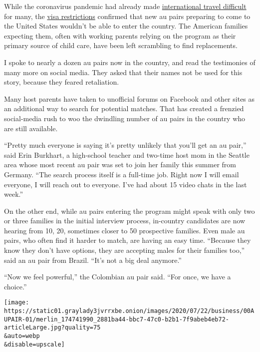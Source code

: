 While the coronavirus pandemic had already made
\href{https://www.nytimes3xbfgragh.onion/2020/05/13/us/politics/trump-coronavirus-border-restrictions.html?action=click\&module=RelatedLinks\&pgtype=Article}{international
travel difficult} for many, the
\href{https://www.nytimes3xbfgragh.onion/2020/06/12/us/politics/coronavirus-trump-immigration-policies.html?action=click\&module=RelatedLinks\&pgtype=Article}{visa
restrictions} confirmed that new au pairs preparing to come to the
United States wouldn't be able to enter the country. The American
families expecting them, often with working parents relying on the
program as their primary source of child care, have been left scrambling
to find replacements.

I spoke to nearly a dozen au pairs now in the country, and read the
testimonies of many more on social media. They asked that their names
not be used for this story, because they feared retaliation.

Many host parents have taken to unofficial forums on Facebook and other
sites as an additional way to search for potential matches. That has
created a frenzied social-media rush to woo the dwindling number of au
pairs in the country who are still available.

``Pretty much everyone is saying it's pretty unlikely that you'll get an
au pair,'' said Erin Burkhart, a high-school teacher and two-time host
mom in the Seattle area whose most recent au pair was set to join her
family this summer from Germany. ``The search process itself is a
full-time job. Right now I will email everyone, I will reach out to
everyone. I've had about 15 video chats in the last week.''

On the other end, while au pairs entering the program might speak with
only two or three families in the initial interview process, in-country
candidates are now hearing from 10, 20, sometimes closer to 50
prospective families. Even male au pairs, who often find it harder to
match, are having an easy time. ``Because they know they don't have
options, they are accepting males for their families too,'' said an au
pair from Brazil. ``It's not a big deal anymore.''

``Now we feel powerful,'' the Colombian au pair said. ``For once, we
have a choice.''

\texttt{[image: https://static01.graylady3jvrrxbe.onion/images/2020/07/22/business/00AUPAIR-01/merlin\_174741990\_2881ba44-bbc7-47c0-b2b1-7f9abeb4eb72-articleLarge.jpg?quality=75\\\&auto=webp\\\&disable=upscale]}

